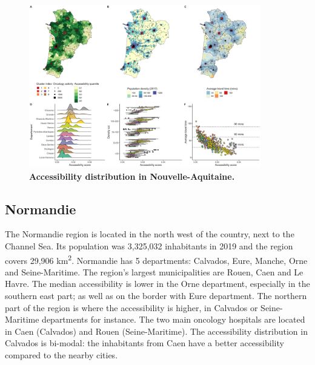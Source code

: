 \begin{figure}[H]
    \includegraphics[width=0.9\textwidth]{images/camion/region_accessibility/accessibility_Nouvelle-Aquitaine.png}
    \centering
    \caption{
        \textbf{Accessibility distribution in Nouvelle-Aquitaine.}
    }
\end{figure}

\subsection*{Normandie}

The Normandie region is located in the north west of the country, next to the
Channel Sea. Its population was 3,325,032 inhabitants in 2019 and the region
covers 29,906 km\textsuperscript{2}. Normandie has 5 departments: Calvados,
Eure, Manche, Orne and Seine-Maritime. The region's largest municipalities are
Rouen, Caen and Le Havre. The median accessibility is lower in the Orne
department, especially in the southern east part; as well as on the border with
Eure department. The northern part of the region is where the accessibility is
higher, in Calvados or Seine-Maritime departments for instance. The two main
oncology hospitals are located in Caen (Calvados) and Rouen (Seine-Maritime).
The accessibility distribution in Calvados is bi-modal: the inhabitants
from Caen have a better accessibility compared to the nearby cities.


